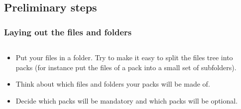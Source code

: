 \documentclass[compress,10pt]{beamer}
\begin{document}
\subsection{Preliminary steps}

\begin{frame}

\frametitle{Laying out the files and folders}

\begin{columns}

  \begin{column}{7cm}
  \begin{itemize}

    \item Put your files in a folder. Try to make it easy to split the
    files tree into packs (for instance put the files of a pack into a small set
    of subfolders).

    \item Think about which files and folders your packs will be made of.

    \item Decide which packs will be mandatory and which packs will be optional.

  \end{itemize}
  \end{column}

  \begin{column}{3cm}
  \end{column}

\end{columns}

\end{frame}

\end{document}

